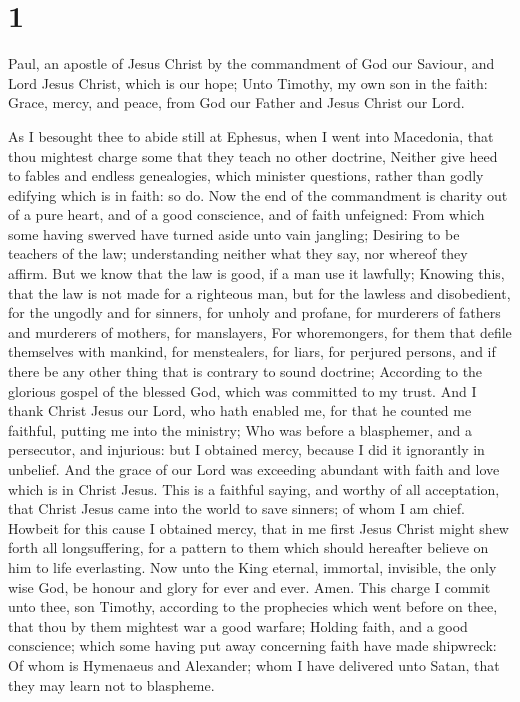 \hypertarget{section}{%
\section{1}\label{section}}

 Paul, an apostle of Jesus Christ by the commandment of
God our Saviour, and Lord Jesus Christ, which is our hope;
 Unto Timothy, my own son in the faith: Grace, mercy, and
peace, from God our Father and Jesus Christ our Lord.

 As I besought thee to abide still at Ephesus, when I went
into Macedonia, that thou mightest charge some that they teach no other
doctrine,  Neither give heed to fables and endless
genealogies, which minister questions, rather than godly edifying which
is in faith: so do.  Now the end of the commandment is
charity out of a pure heart, and of a good conscience, and of faith
unfeigned:  From which some having swerved have turned
aside unto vain jangling;  Desiring to be teachers of the
law; understanding neither what they say, nor whereof they affirm.
 But we know that the law is good, if a man use it
lawfully;  Knowing this, that the law is not made for a
righteous man, but for the lawless and disobedient, for the ungodly and
for sinners, for unholy and profane, for murderers of fathers and
murderers of mothers, for manslayers,  For whoremongers,
for them that defile themselves with mankind, for menstealers, for
liars, for perjured persons, and if there be any other thing that is
contrary to sound doctrine;  According to the glorious
gospel of the blessed God, which was committed to my trust.
 And I thank Christ Jesus our Lord, who hath enabled me,
for that he counted me faithful, putting me into the ministry;
 Who was before a blasphemer, and a persecutor, and
injurious: but I obtained mercy, because I did it ignorantly in
unbelief.  And the grace of our Lord was exceeding
abundant with faith and love which is in Christ Jesus. 
This is a faithful saying, and worthy of all acceptation, that Christ
Jesus came into the world to save sinners; of whom I am chief.
 Howbeit for this cause I obtained mercy, that in me
first Jesus Christ might shew forth all longsuffering, for a pattern to
them which should hereafter believe on him to life everlasting.
 Now unto the King eternal, immortal, invisible, the only
wise God, be honour and glory for ever and ever. Amen. 
This charge I commit unto thee, son Timothy, according to the prophecies
which went before on thee, that thou by them mightest war a good
warfare;  Holding faith, and a good conscience; which
some having put away concerning faith have made shipwreck:
 Of whom is Hymenaeus and Alexander; whom I have
delivered unto Satan, that they may learn not to blaspheme.

